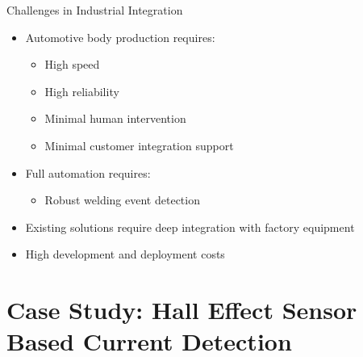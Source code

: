 \documentclass{beamer}
\begin{document}

\begin{frame}{Challenges in Industrial Integration}
    \begin{itemize}
        \item Automotive body production requires:
        \begin{itemize}
            \item High speed
            \item High reliability
            \item Minimal human intervention
            \item Minimal customer integration support
        \end{itemize}
        \item Full automation requires:
        \begin{itemize}
            \item Robust welding event detection
        \end{itemize}
        \item Existing solutions require deep integration with factory equipment
        \item High development and deployment costs
    \end{itemize}
\end{frame}


\section{Case Study: Hall Effect Sensor Based Current Detection}
\end{document}
